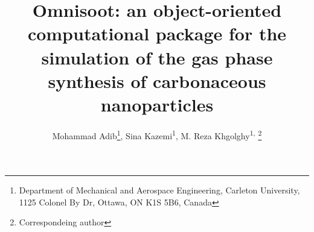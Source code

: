 	\title{\renewcommand\baselinestretch{1}\bf
		Omnisoot: an object-oriented computational package for the simulation of the gas phase synthesis of carbonaceous nanoparticles
		}
	\renewcommand\baselinestretch{0.8}
	\author{
	Mohammad Adib\footnote{\scriptsize{Department of Mechanical and Aerospace Engineering, Carleton University, 1125 Colonel By Dr, Ottawa, ON K1S 5B6, Canada}},
	Sina Kazemi\textsuperscript{1}{\vspace{0.4em}},  
	M. Reza Khgolghy\textsuperscript{1, }\footnote{\scriptsize{Correspondeing author}} 
}
	\date{}
	\maketitle
	\renewcommand\baselinestretch{1.3}